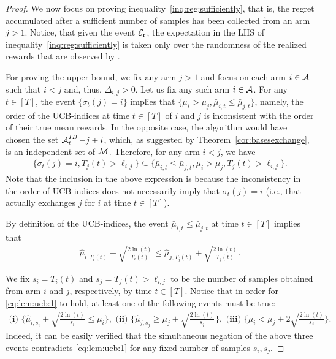 \begin{proof}
We now focus on proving inequality~\eqref{inq:reg:sufficiently}, that is, the regret accumulated after a sufficient number of samples has been collected from an arm $j > 1$. Notice, that given the event $\mathcal{E}_{\operatorname{\mathbf{r}}}$, the expectation in the LHS of inequality~\eqref{inq:reg:sufficiently} is taken only over the randomness of the realized rewards that are observed by \UCB. 


For proving the upper bound, we fix any arm $j > 1$ and focus on each arm $i \in \operatorname{\mathcal{A}}$ such that $i < j$ and, thus, $\Delta_{i,j}>0$. Let us fix any such arm $i \in \operatorname{\mathcal{A}}$. For any $t \in [T]$, the event $\{\sigma_t(j) = i\}$ implies that $\{\mu_{i} > \mu_j, \bar{\mu}_{i,t} \leq \bar{\mu}_{j,t}\}$, namely, the order of the UCB-indices at time $t \in [T]$ of $i$ and $j$ is inconsistent with the order of their true mean rewards. In the opposite case, the algorithm \UCB would have chosen the set $\operatorname{\mathcal{A}}^{IB}_t - j + i$, which, as suggested by Theorem~\ref{cor:basesexchange}, is an independent set of $\operatorname{\mathcal{M}}$. Therefore, for any arm $i < j$, we have
\begin{align}
    \{\sigma_t(j)=i, T_j(t) > \ell_{i,j}\} \subseteq \{\bar{\mu}_{i,t} \leq \bar{\mu}_{j,t},\mu_i > \mu_j, T_j(t) > \ell_{i,j}\}. \label{eq:lem:ucb:0}
\end{align}
Note that the inclusion in the above expression is because the inconsistency in the order of UCB-indices does not necessarily imply that $\sigma_t(j)=i$ (i.e., that \UCB actually exchanges $j$ for $i$ at time $t \in [T]$).

By definition of the UCB-indices, the event $\bar{\mu}_{i,t} \leq \bar{\mu}_{j,t}$ at time $t \in [T]$ implies that 
\begin{align}
    \hat{\mu}_{i,T_{i}(t)} + \sqrt{\frac{2 \ln{(t)}}{T_{i}(t)}} \leq \hat{\mu}_{j,T_{j}(t)} + \sqrt{\frac{2 \ln{(t)}}{T_{j}(t)}}. \label{eq:lem:ucb:1}
\end{align}

We fix $s_i = T_i(t)$ and $s_j = T_j(t) > \ell_{i,j}$ to be the number of samples obtained from arm $i$ and $j$, respectively, by time $t \in [T]$. Notice that in order for \eqref{eq:lem:ucb:1} to hold, at least one of the following events must be true:
\begin{align*}
     \textbf{(i) }\bigg\{\hat{\mu}_{i,s_{i}} + \sqrt{\frac{2 \ln{(t)}}{s_i}} \leq \mu_i \bigg\}, \textbf{   (ii)  }\bigg\{\hat{\mu}_{j,s_{j}} \geq \mu_j + \sqrt{\frac{2 \ln{(t)}}{s_{j}}}\bigg\},\textbf{   (iii)  } \bigg\{\mu_i < \mu_j + 2 \sqrt{\frac{2 \ln{(t)}}{s_j}}\bigg\}.
\end{align*}
Indeed, it can be easily verified that the simultaneous negation of the above three events contradicts \eqref{eq:lem:ucb:1} for any fixed number of samples $s_i,s_j$. 


\end{proof}
